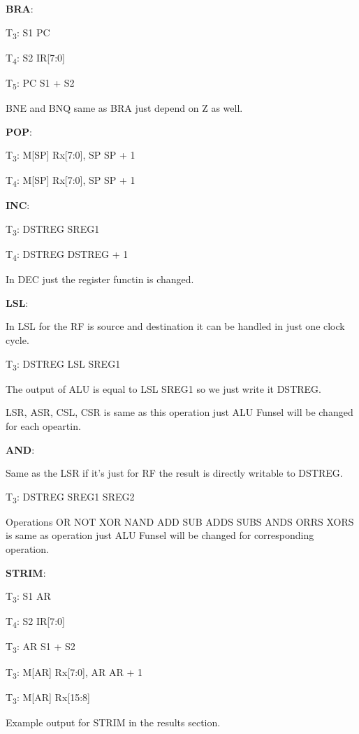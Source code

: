 \documentclass[pdftex,12pt,a4paper]{article}
\begin{document}
	\textbf{BRA}:\par
	T\textsubscript{3}: S1 \xleftarrow{} PC\par
	T\textsubscript{4}: S2 \xleftarrow{} IR[7:0]\par
	T\textsubscript{5}: PC \xleftarrow{} S1 + S2\par
	BNE and BNQ same as BRA just depend on Z as well.\par
	\textbf{POP}:\par
	T\textsubscript{3}: M[SP] \xleftarrow{} Rx[7:0], SP \xleftarrow{} SP + 1\par
	T\textsubscript{4}: M[SP] \xleftarrow{} Rx[7:0], SP \xleftarrow{} SP + 1\par
	\textbf{INC}:\par
	T\textsubscript{3}: DSTREG \xleftarrow{} SREG1\par
	T\textsubscript{4}: DSTREG \xleftarrow{} DSTREG + 1\par
	In DEC just the register functin is changed.\par
	\textbf{LSL}:\par
	In LSL for the RF is source and destination it can be handled in just one clock cycle.\par
	T\textsubscript{3}: DSTREG \xleftarrow{} LSL SREG1\par
	The output of ALU is equal to LSL SREG1 so we just write it DSTREG.\par
	LSR, ASR, CSL, CSR is same as this operation just ALU Funsel will be changed for each opeartin.\par
	\textbf{AND}:\par
	Same as the LSR if it's just for RF the result is directly writable to DSTREG.\par
	T\textsubscript{3}: DSTREG \xleftarrow{} SREG1 \land SREG2\par
	Operations OR NOT XOR NAND ADD SUB ADDS SUBS ANDS ORRS XORS is same as operation just ALU Funsel will be changed for corresponding operation.\par
	\textbf{STRIM}:\par
	T\textsubscript{3}: S1 \xleftarrow{} AR\par
	T\textsubscript{4}: S2 \xleftarrow{} IR[7:0]\par
	T\textsubscript{3}: AR \xleftarrow{} S1 + S2\par
	T\textsubscript{3}: M[AR] \xleftarrow{} Rx[7:0], AR \xleftarrow{} AR + 1\par
	T\textsubscript{3}: M[AR] \xleftarrow{} Rx[15:8]\par
	Example output for STRIM in the results section.
	
\end{document}
